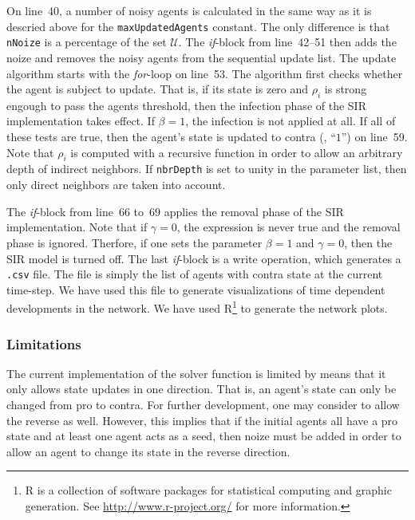 On line~40, a number of noisy agents is calculated in the same way as it is
descried above for the \texttt{maxUpdatedAgents} constant.  The only difference
is that \texttt{nNoize} is a percentage of the set $\mathcal{U}$.  The
\textsl{if}-block from line~42--51 then adds the noize and removes the noisy
agents from the sequential update list.  The update algorithm starts with the
\textsl{for}-loop on line~53.  The algorithm first checks whether the agent is
subject to update.  That is, if its state is zero and $\rho_i$ is strong
engough to pass the agents threshold, then the infection phase of the SIR
implementation takes effect.  If $\beta = 1$, the infection is not applied at
all.  If all of these tests are true, then the agent's state is updated to
contra (\ie, ``$1$'') on line~59.  Note that $\rho_i$ is computed with a
recursive function in order to allow an arbitrary depth of indirect neighbors.
If \texttt{nbrDepth} is set to unity in the parameter list, then only direct
neighbors are taken into account.

The \textsl{if}-block from line~66 to~69 applies the removal phase of the SIR
implementation.  Note that if $\gamma = 0$, the expression is never true and
the removal phase is ignored.  Therfore, if one sets the parameter $\beta = 1$
and $\gamma = 0$, then the SIR model is turned off.  The last \textsl{if}-block
is a write operation, which generates a \texttt{.csv} file.  The file is simply
the list of agents with contra state at the current time-step.  We have used
this file to generate visualizations of time dependent developments in the
network.  We have used R\footnote{R is a collection of software packages for
  statistical computing and graphic generation.  See
  \url{http://www.r-project.org/} for more information.} to generate the
network plots.

\subsubsection{Limitations}
\label{sec:solverLimitations}

The current implementation of the solver function is limited by means that it
only allows state updates in one direction.  That is, an agent's state can only
be changed from pro to contra.  For further development, one may consider to
allow the reverse as well.  However, this implies that if the initial agents
all have a pro state and at least one agent acts as a seed, then noize must be
added in order to allow an agent to change its state in the reverse direction.

